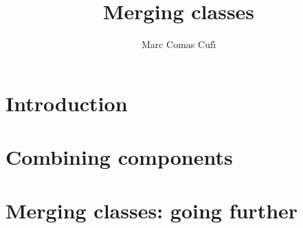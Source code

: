 \documentclass[10pt]{beamer}
\title{Merging classes}
\author{Marc Comas Cuf\'{\i}}
\date{}
\begin{document}
\begin{frame}
\titlepage
\end{frame}

\section{Introduction}



%

\section{Combining components}





\section{Merging classes: going further}



%
\end{document}
